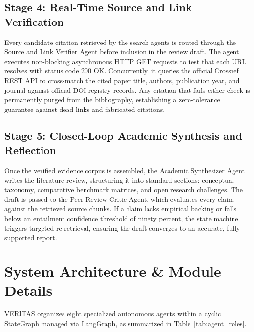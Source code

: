 \documentclass[11pt,a4paper]{article}
\begin{document}
\subsection{Stage 4: Real-Time Source and Link Verification}
Every candidate citation retrieved by the search agents is routed through the Source and Link Verifier Agent before inclusion in the review draft. The agent executes non-blocking asynchronous HTTP GET requests to test that each URL resolves with status code $200\text{ OK}$. Concurrently, it queries the official Crossref REST API to cross-match the cited paper title, authors, publication year, and journal against official DOI registry records. Any citation that fails either check is permanently purged from the bibliography, establishing a zero-tolerance guarantee against dead links and fabricated citations.

\subsection{Stage 5: Closed-Loop Academic Synthesis and Reflection}
Once the verified evidence corpus is assembled, the Academic Synthesizer Agent writes the literature review, structuring it into standard sections: conceptual taxonomy, comparative benchmark matrices, and open research challenges. The draft is passed to the Peer-Review Critic Agent, which evaluates every claim against the retrieved source chunks. If a claim lacks empirical backing or falls below an entailment confidence threshold of ninety percent, the state machine triggers targeted re-retrieval, ensuring the draft converges to an accurate, fully supported report.

\section{System Architecture \& Module Details}
VERITAS organizes eight specialized autonomous agents within a cyclic StateGraph managed via LangGraph, as summarized in Table~\ref{tab:agent_roles}.
\end{document}
